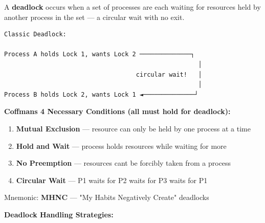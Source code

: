 \documentclass[11pt]{article}
\providecommand{\tightlist}{\setlength{\itemsep}{1pt}\setlength{\parskip}{0pt}}
\begin{document}
A \textbf{deadlock} occurs when a set of processes are each waiting for resources held by another process in the set --- a circular wait with no exit.

\setcodelang{}

\begin{verbatim}
Classic Deadlock:

Process A holds Lock 1, wants Lock 2 ──────────────┐
                                                     │
                                    circular wait!   │
                                                     │
Process B holds Lock 2, wants Lock 1 ◄──────────────┘
\end{verbatim}

\textbf{Coffman\textquotesingle s 4 Necessary Conditions (all must hold for deadlock):}

\begin{enumerate}
\def\labelenumi{\arabic{enumi}.}
\tightlist
\item
  \textbf{Mutual Exclusion} --- resource can only be held by one process at a time
\item
  \textbf{Hold and Wait} --- process holds resources while waiting for more
\item
  \textbf{No Preemption} --- resources can\textquotesingle t be forcibly taken from a process
\item
  \textbf{Circular Wait} --- P1 waits for P2 waits for P3 waits for P1
\end{enumerate}

Mnemonic: \textbf{MHNC} --- "My Habits Negatively Create" deadlocks

\textbf{Deadlock Handling Strategies:}
\end{document}

